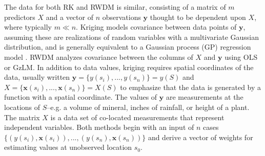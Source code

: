 \documentclass[]{interact}
\theoremstyle{plain}%
\theoremstyle{definition}
\theoremstyle{remark}
\begin{document}

The data for both RK and RWDM is similar, consisting of a matrix of $m$ predictors $X$ and a vector of $n$ observations $\bm{y}$ thought to be dependent upon $X$, where typically $m \ll n$.  Kriging models covariance between data points of $\bm{y}$, assuming these are realizations of random variables with a multivariate Gaussian distribution, and is generally equivalent to a Gaussian process (GP) regression model \citep{rasmussen06}.  RWDM analyzes covariance between the columns of $X$ and $\bm{y}$ using OLS or GzLM.  In addition to data values, kriging requires spatial coordinates of the data, usually written $\bm{y}=\{y(s_i), ..., y(s_n)\}=y(S)$ and $X=\{\bm{x}(s_i), ..., \bm{x}(s_n)\}=X(S)$ to emphasize that the data is generated by a function with a spatial coordinate.  The values of $\bm{y}$ are measurements at the locations of $S$--e.g. a volume of mineral, inches of rainfall, or height of a plant.  The matrix $X$ is a data set of co-located measurements that represent independent variables.  Both methods begin with an input of $n$ cases $\{(y(s_i), \bm{x}(s_i)), ..., (y(s_n), \bm{x}(s_n))\}$ and derive a vector of weights for estimating values at unobserved location $s_0$.
\end{document}
